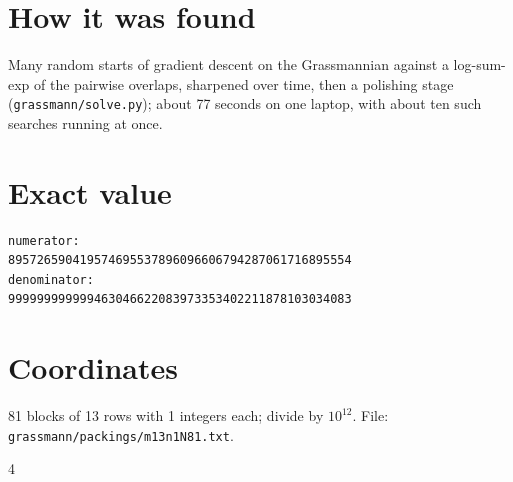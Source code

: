 \documentclass[11pt,a4paper]{article}
\begin{document}
\section{How it was found}
Many random starts of gradient descent on the Grassmannian against a log-sum-exp of the pairwise overlaps, sharpened over time, then a polishing stage (\texttt{grassmann/solve.py}); about 77 seconds on one laptop, with about ten such searches running at once.


\appendix
\section{Exact value}
{\small
\begin{verbatim}
numerator:
895726590419574695537896096606794287061716895554
denominator:
999999999999463046622083973353402211878103034083
\end{verbatim}}

\section{Coordinates}
81 blocks of 13 rows with 1 integers each; divide by $10^{12}$. File: \texttt{grassmann/packings/m13n1N81.txt}.
{\tiny
\begin{multicols}{4}
\end{multicols}}
\end{document}
